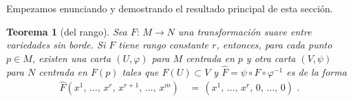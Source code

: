 \theoremstyle{plain}
\newtheorem{teoDelRango}{Teorema}[section]
\newtheorem{coroDelRangoLineal}[teoDelRango]{Corolario}
\newtheorem{coroDelRangoGlobal}[teoDelRango]{Corolario}
\newtheorem{teoInmersionConBorde}[teoDelRango]{Teorema}

\theoremstyle{remark}
\newtheorem{obsInmersionConBorde}{Observaci\'{o}n}[section]


Empezamos enunciando y demostrando el resultado principal de esta secci\'{o}n.

\begin{teoDelRango}[del rango]\label{thm:delrango}
	Sea $F:\,M\rightarrow N$ una transformaci\'{o}n suave entre variedades
	\emph{sin} borde. Si $F$ tiene rango constante $r$, entonces, para
	cada punto $p\in M$, existen una carta $(U,\varphi)$ para $M$
	centrada en $p$ y otra carta $(V,\psi)$ para $N$ centrada en $F(p)$
	tales que $F(U)\subset V$ y $\widehat{F}=%
	\psi\circ F\circ\varphi^{-1}$ es de la forma
	\begin{align*}
		\widehat{F}(x^{1},\,\dots,\,x^{r},\,x^{r+1},\,\dots,\,x^{m}) &
			\,=\,(x^{1},\,\dots,\,x^{r},\,0,\,\dots,\,0)
		\text{ .}
	\end{align*}
\end{teoDelRango}

